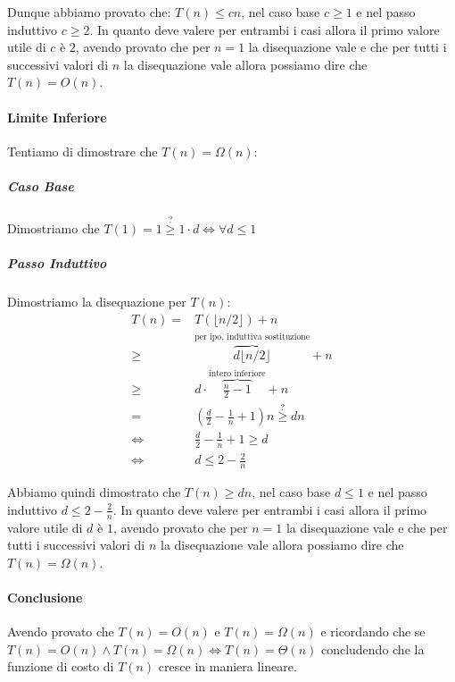                 Dunque abbiamo provato che: $ T(n) \leq cn $, nel caso base $ c\geq 1 $ e nel passo induttivo $ c\geq 2 $. In quanto deve valere per entrambi i casi allora il primo valore utile di $ c $ è $2$, avendo provato che per $ n=1 $ la disequazione vale e che per tutti i successivi valori di $ n $ la disequazione vale allora possiamo dire che $ T(n) = O(n) $.
            \paragraph{Limite Inferiore}
                Tentiamo di dimostrare che $ T(n) = \Omega(n) $:
                \subparagraph{Caso Base} Dimostriamo che $ T(1) = 1 \stackrel{?}{\geq} 1\cdot d \Leftrightarrow \forall d\leq 1 $
                \subparagraph{Passo Induttivo} Dimostriamo la disequazione per $ T(n) $:
                $$
                    \begin{aligned}
                        T(n) =& T(\lfloor n/2 \rfloor) + n \\
                        \geq & \overbrace{d\lfloor n/2 \rfloor}^{\text{per ipo. induttiva sostituzione}} + n \\
                        \geq & d\cdot\overbrace{\frac{n}2-1}^{\text{intero inferiore}} + n \\
                        = & \left(\frac{d}2-\frac1n+1\right)n \stackrel{?}{\geq} dn \\
                        \Leftrightarrow & \frac{d}2-\frac1n+1 \geq d \\ 
                        \Leftrightarrow & d\leq 2 - \frac2n
                    \end{aligned}
                $$

                Abbiamo quindi dimostrato che $ T(n) \geq dn $, nel caso base $ d\leq 1 $ e nel passo induttivo $ d\leq 2 - \frac2n $. In quanto deve valere per entrambi i casi allora il primo valore utile di $ d $ è $1$, avendo provato che per $ n=1 $ la disequazione vale e che per tutti i successivi valori di $ n $ la disequazione vale allora possiamo dire che $ T(n) = \Omega(n) $.
                
            \paragraph{Conclusione} Avendo provato che $ T(n) = O(n) $ e $ T(n) = \Omega(n) $ e ricordando che se $ T(n) = O(n) \land T(n) = \Omega(n) \Leftrightarrow T(n) = \Theta(n) $ concludendo che la funzione di costo di $ T(n) $ cresce in maniera lineare.
